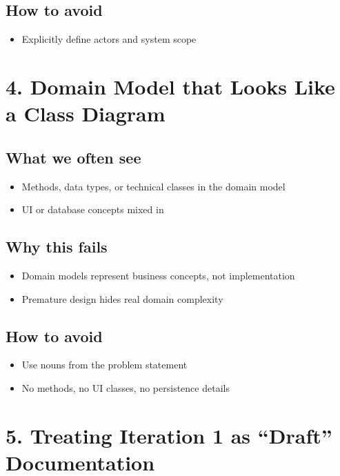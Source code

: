 \documentclass{article}
\begin{document}
\subsection*{How to avoid}
\begin{itemize}[noitemsep]
    \item Explicitly define actors and system scope
\end{itemize}

\section*{4. Domain Model that Looks Like a Class Diagram}

\subsection*{What we often see}
\begin{itemize}[noitemsep]
    \item Methods, data types, or technical classes in the domain model
    \item UI or database concepts mixed in
\end{itemize}

\subsection*{Why this fails}
\begin{itemize}[noitemsep]
    \item Domain models represent business concepts, not implementation
    \item Premature design hides real domain complexity
\end{itemize}

\subsection*{How to avoid}
\begin{itemize}[noitemsep]
    \item Use nouns from the problem statement
    \item No methods, no UI classes, no persistence details
\end{itemize}

\section*{5. Treating Iteration 1 as ``Draft'' Documentation}
\end{document}
